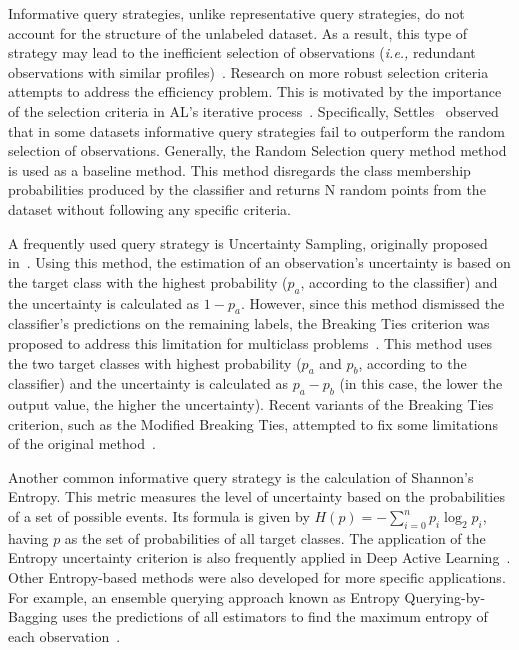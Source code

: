\documentclass[parskip=full]{scrartcl}
\begin{document}
Informative query strategies, unlike representative query strategies, do not
account for the structure of the unlabeled dataset. As a result, this type of
strategy may lead to the inefficient selection of observations (\textit{i.e.,}
redundant observations with similar profiles)~\cite{Kumar2020}. Research on
more robust selection criteria attempts to address the efficiency problem.
This is motivated by the importance of the selection criteria in AL's
iterative process~\cite{Rosario2020}. Specifically, Settles~\cite{Settles2011}
observed that in some datasets informative query strategies fail to outperform
the random selection of observations. Generally, the Random Selection query
method method is used as a baseline method. This method disregards the class
membership probabilities produced by the classifier and returns N random
points from the dataset without following any specific criteria.

A frequently used query strategy is Uncertainty Sampling, originally proposed
in~\cite{Lewis1994}. Using this method, the estimation of an observation's
uncertainty is based on the target class with the highest probability ($p_a$,
according to the classifier) and the uncertainty is calculated as $1-p_a$.
However, since this method dismissed the classifier's predictions on the
remaining labels, the Breaking Ties criterion was proposed to address this
limitation for multiclass problems~\cite{Luo2005}. This method uses the two
target classes with highest probability ($p_a$ and $p_b$, according to the
classifier) and the uncertainty is calculated as $p_a - p_b$ (in this case,
the lower the output value, the higher the uncertainty). Recent variants of
the Breaking Ties criterion, such as the Modified Breaking Ties, attempted to
fix some limitations of the original method~\cite{Liu2018, Li2012a}.

Another common informative query strategy is the calculation of Shannon's
Entropy. This metric measures the level of uncertainty
based on the probabilities of a set of possible events. Its formula is given
by $H(p)=-\sum_{i=0}^n{p_i\log_2{p_i}}$, having $p$ as the set of
probabilities of all target classes. The application of the Entropy
uncertainty criterion is also frequently applied in Deep Active
Learning~\cite{Aghdam2019}. Other Entropy-based methods were also developed
for more specific applications. For example, an ensemble querying approach
known as Entropy Querying-by-Bagging uses the predictions of all estimators to
find the maximum entropy of each observation~\cite{Abe1998}.
\end{document}
